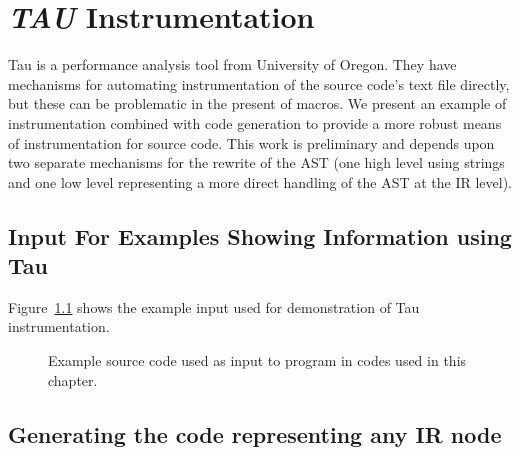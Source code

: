 \chapter{{\em TAU} Instrumentation}

  Tau is a performance analysis tool from University of 
Oregon.  They have mechanisms for automating instrumentation
of the source code's text file directly, but these can be
problematic in the present of macros. We present an example
of instrumentation combined with code generation to provide a more
robust means of instrumentation for source code.  This work is
preliminary and depends upon two separate mechanisms for the
rewrite of the AST (one high level using strings and one low level
representing a more direct handling of the AST at the IR level).

\section{Input For Examples Showing Information using Tau}

   Figure~\ref{Tutorial:exampleInputCode_tauInstrumenter}
shows the example input used for demonstration of Tau instrumentation.


\begin{figure}[!h]
{\indent
{\mySmallFontSize

\begin{latexonly}
   
\end{latexonly}

\begin{htmlonly}
   
\end{htmlonly}

}
}
\caption{Example source code used as input to program in
         codes used in this chapter.}
\label{Tutorial:exampleInputCode_tauInstrumenter}
\end{figure}



\section{Generating the code representing any IR node}

